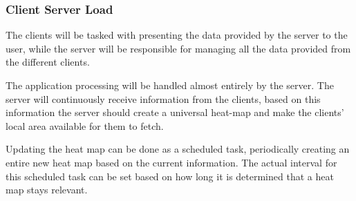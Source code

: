 \subsubsection{Client Server Load}
The clients will be tasked with presenting the data provided by the server to the user, while the server will be responsible for managing all the data provided from the different clients.

The application processing will be handled almost entirely by the server. The server will continuously receive information from the clients, based on this information the server should create a universal heat-map and make the clients' local area available for them to fetch.

Updating the heat map can be done as a scheduled task, periodically creating an entire new heat map based on the current information. The actual interval for this scheduled task can be set based on how long it is determined that a heat map stays relevant.





